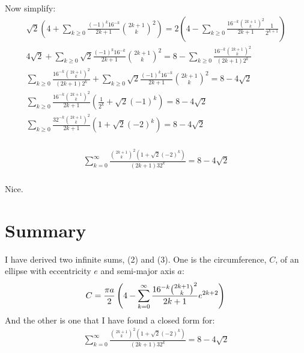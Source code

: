 \documentclass{article}
\begin{document}
Now simplify:
\begin{equation*}
\begin{split}
	\sqrt{2} \left( 4 +
	\sum_{k\geq 0} \frac{(-1)^{k}16^{-k}}{2k+1}{{2k+1}\choose k}^2\right)
	= 2\left(4-\sum_{k\geq 0}\frac{16^{-k}{{2k+1}\choose k}^2}{2k+1}\frac{1}{2^{k+1}}\right)\\
	4\sqrt2 +
	\sum_{k\geq 0} \sqrt2\frac{(-1)^{k}16^{-k}}{2k+1}{{2k+1}\choose k}^2
	= 8-\sum_{k\geq 0}\frac{16^{-k}{{2k+1}\choose k}^2}{(2k+1)2^k}\\
	\sum_{k\geq 0}\frac{16^{-k}{{2k+1}\choose k}^2}{(2k+1)2^k} +
	\sum_{k\geq 0} \sqrt2\frac{(-1)^{k}16^{-k}}{2k+1}{{2k+1}\choose k}^2
	= 8 - 4\sqrt2\\
	\sum_{k\geq 0} \frac{16^{-k}{{2k+1}\choose k}^2}{2k+1} \left(\frac{1}{2^k} +
	\sqrt2(-1)^{k} \right)
	= 8 - 4\sqrt2\\
	\sum_{k\geq 0} \frac{32^{-k}{{2k+1}\choose k}^2}{2k+1} \left(1 +
	\sqrt2(-2)^{k} \right)
	= 8 - 4\sqrt2\\
\end{split}
\end{equation*}
\begin{tcolorbox}
\begin{equation}
\begin{split}
	\sum_{k=0}^{\infty} \frac{{{2k+1}\choose k}^2\left(1+\sqrt2(-2)^{k} \right)}{(2k+1)32^k} 
	= 8 - 4\sqrt2\\
\end{split}
\end{equation}
\end{tcolorbox}
Nice.


\section{Summary}
I have derived two infinite sums, (2) and (3). One is the circumference, $C$, of an ellipse with eccentricity $e$ and semi-major axis $a$:
\begin{equation*}
	C = \frac{\pi a}{2}\left(4-\sum_{k=0}^{\infty}\frac{16^{-k}{{2k+1}\choose k}^2}{2k+1}e^{2k+2}\right)\\
\end{equation*}
And the other is one that I have found a closed form for:
\begin{equation*}
\begin{split}
	\sum_{k=0}^{\infty} \frac{{{2k+1}\choose k}^2\left(1+\sqrt2(-2)^{k} \right)}{(2k+1)32^k} 
	= 8 - 4\sqrt2\\
\end{split}
\end{equation*}
\end{document}
